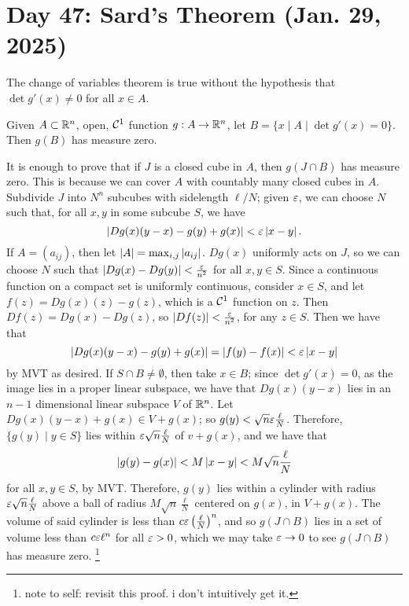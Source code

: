 \section{Day 47: Sard's Theorem (Jan. 29, 2025)}
The change of variables theorem is true without the hypothesis that $\det g'(x) \neq 0$ for all $x \in A$.
\begin{simplethm}
    Given $A \subset \mathbb R^n$, open, $\mathcal C^1$ function $g : A \to \mathbb R^n$, let $B = \{ x \mid A \mid \det g'(x) = 0\}$. Then $g(B)$ has measure zero.
\end{simplethm}
\noindent It is enough to prove that if $J$ is a closed cube in $A$, then $g(J \cap B)$ has measure zero. This is because we can cover $A$ with countably many closed cubes in $A$. Subdivide $J$ into $N^n$ subcubes with sidelength $\ell/N$; given $\varepsilon$, we can choose $N$ such that, for all $x, y$ in some subcube $S$, we have
\[ \left\lvert Dg(x)(y - x) - g(y) + g(x) \right\rvert < \varepsilon \left\lvert x - y \right\rvert. \]
If $A = (a_{ij})$, then let $\left\lvert A \right\rvert = \max_{i,j} \left\lvert a_{ij} \right\rvert$. $Dg(x)$ uniformly acts on $J$, so we can choose $N$ such that $\left\lvert Dg(x) - Dg(y) \right\rvert < \frac{\varepsilon}{n^2}$ for all $x, y \in S$. Since a continuous function on a compact set is uniformly continuous, consider $x \in S$, and let $f(z) = Dg(x)(z) - g(z)$, which is a $\mathcal C^1$ function on $z$. Then $Df(z) = Dg(x) - Dg(z)$, so $\left\lvert Df(z) \right\rvert < \frac{\varepsilon}{n^2}$, for any $z \in S$. Then we have that
\[ \left\lvert Dg(x)(y - x) - g(y) + g(x) \right\rvert = \left\lvert f(y) - f(x) \right\rvert < \varepsilon \left\lvert x - y \right\rvert \]
by MVT as desired. If $S \cap B \neq \emptyset$, then take $x \in B$; since $\det g'(x) = 0$, as the image lies in a proper linear subspace, we have that $Dg(x)(y-x)$ lies in an $n-1$ dimensional linear subspace $V$ of $\mathbb R^n$. Let $Dg(x)(y-x) + g(x) \in V + g(x)$; so $g(y) < \sqrt{n} \varepsilon \frac{\ell}{N}$. Therefore, $\{ g(y) \mid y \in S \}$ lies within $\varepsilon \sqrt{n} \frac{\ell}{N}$ of $v + g(x)$, and we have that
\[ \left\lvert g(y) - g(x) \right\rvert < M \left\lvert x - y \right\rvert < M \sqrt{n} \frac{\ell}{N} \]
for all $x, y \in S$, by MVT. Therefore, $g(y)$ lies within a cylinder with radius $\varepsilon \sqrt{n} \frac{\ell}{N}$ above a ball of radius $M \sqrt{n} \frac{\ell}{N}$ centered on $g(x)$, in $V + g(x)$. The volume of said cylinder is less than $c \varepsilon \left(\frac{\ell}{N}\right)^n$, and so $g(J \cap B)$ lies in a set of volume less than $c \varepsilon \ell^n$ for all $\varepsilon > 0$, which we may take $\varepsilon \to 0$ to see $g(J \cap B)$ has measure zero. \footnote{note to self: revisit this proof. i don't intuitively get it.}